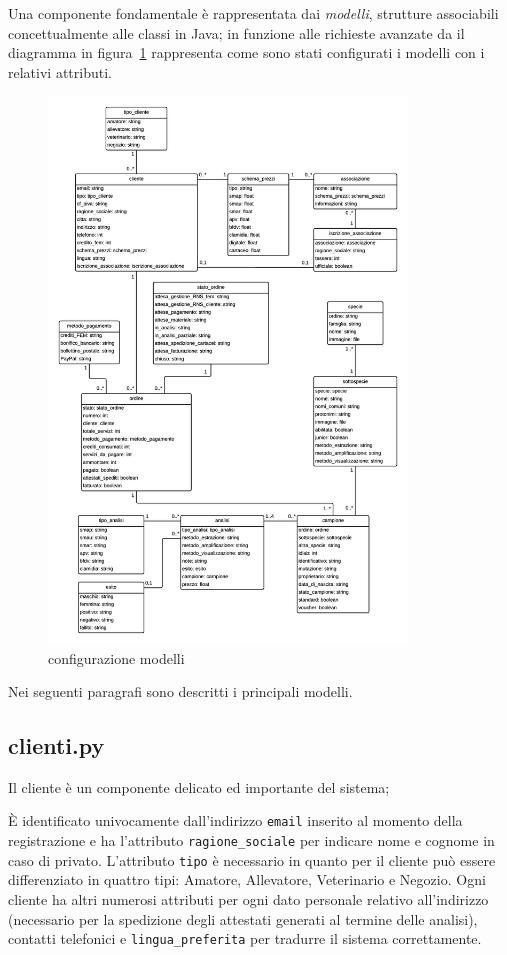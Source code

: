Una componente fondamentale è rappresentata dai \emph{modelli}, strutture associabili concettualmente alle classi in Java; in funzione alle richieste avanzate da {\fem} il diagramma in figura~\ref{fig:modelli} rappresenta come sono stati configurati i modelli con i relativi attributi.

\begin{figure}
 \centering
 \includegraphics[width=0.85\textwidth]{images/modelli} 
 \caption{configurazione modelli}
 \label{fig:modelli}
\end{figure}

Nei seguenti paragrafi sono descritti i principali modelli.

\subsection*{clienti.py}
\label{subs:clienti}
Il cliente è un componente delicato ed importante del sistema; 

È identificato univocamente dall'indirizzo \texttt{email} inserito al momento della registrazione e ha l'attributo \texttt{ragione\_sociale} per indicare nome e cognome in caso di privato. L'attributo \texttt{tipo} è necessario in quanto per {\fem} il cliente può essere differenziato in quattro tipi: Amatore, Allevatore, Veterinario e Negozio. Ogni cliente ha altri numerosi attributi per ogni dato personale relativo all'indirizzo (necessario per la spedizione degli attestati generati al termine delle analisi), contatti telefonici e \texttt{lingua\_preferita} per tradurre il sistema correttamente.

